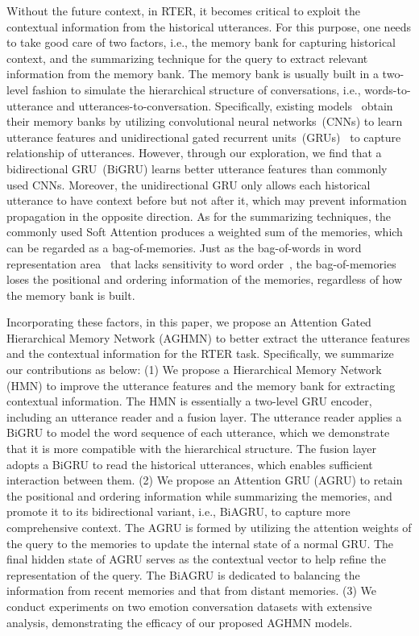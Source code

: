 \documentclass[letterpaper]{article} %
\begin{document}
Without the future context, in RTER, it becomes critical to exploit the contextual information from the historical utterances. For this purpose, one needs to take good care of two factors, i.e., the memory bank for capturing historical context, and the summarizing technique for the query to extract relevant information from the memory bank.
The memory bank is usually built in a two-level fashion to simulate the hierarchical structure of conversations, i.e., words-to-utterance and utterances-to-conversation. Specifically, existing models~\cite{DBLP:conf/emnlp/HazarikaPMCZ18,DBLP:conf/naacl/HazarikaPZCMZ18,DBLP:conf/aaai/MajumderPHMGC19} obtain their memory banks by utilizing convolutional neural networks~(CNNs) to learn utterance features and unidirectional gated recurrent units~(GRUs)~\cite{DBLP:conf/emnlp/ChoMGBBSB14} to capture relationship of utterances. However, through our exploration, we find that a bidirectional GRU~(BiGRU) learns better utterance features than commonly used CNNs. Moreover, the unidirectional GRU only allows each historical utterance to have context before but not after it, which may prevent information propagation in the opposite direction. As for the summarizing techniques, the commonly used Soft Attention produces a weighted sum of the memories, which can be regarded as a bag-of-memories. Just as the bag-of-words in word representation area~\cite{DBLP:conf/nips/MikolovSCCD13} that lacks sensitivity to word order~\cite{DBLP:conf/emnlp/LingTAFDBTL15}, the bag-of-memories loses the positional and ordering information of the memories, regardless of how the memory bank is built.

Incorporating these factors, in this paper, we propose an Attention Gated Hierarchical Memory Network (AGHMN) to better extract the utterance features and the contextual information for the RTER task. Specifically, we summarize our contributions as below: (1) We propose a Hierarchical Memory Network (HMN) to improve the utterance features and the memory bank for extracting contextual information. The HMN is essentially a two-level GRU encoder, including an utterance reader and a fusion layer. 
The utterance reader applies a BiGRU to model the word sequence of each utterance, which we demonstrate that it is more compatible with the hierarchical structure. The fusion layer adopts a BiGRU to read the historical utterances, which enables sufficient interaction between them. 
(2) We propose an Attention GRU (AGRU) to retain the positional and ordering information while summarizing the memories, and promote it to its bidirectional variant, i.e., BiAGRU, to capture more comprehensive context. The AGRU is formed by utilizing the attention weights of the query to the memories to update the internal state of a normal GRU. The final hidden state of AGRU serves as the contextual vector to help refine the representation of the query. The BiAGRU is dedicated to balancing the information from recent memories and that from distant memories.
(3) We conduct experiments on two emotion conversation datasets with extensive analysis, demonstrating the efficacy of our proposed AGHMN models.
\end{document}
